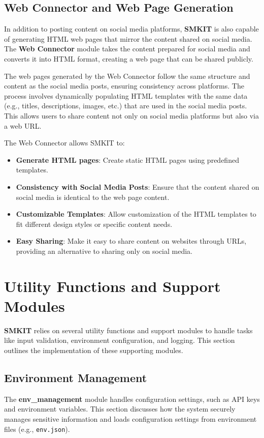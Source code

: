 \subsection{Web Connector and Web Page Generation}
\label{subsec:web_connector_and_web_page_generation}
In addition to posting content on social media platforms, \textbf{SMKIT} is also capable of generating HTML web pages that mirror the content shared on social media. The \textbf{Web Connector} module takes the content prepared for social media and converts it into HTML format, creating a web page that can be shared publicly.

The web pages generated by the Web Connector follow the same structure and content as the social media posts, ensuring consistency across platforms. The process involves dynamically populating HTML templates with the same data (e.g., titles, descriptions, images, etc.) that are used in the social media posts. This allows users to share content not only on social media platforms but also via a web URL.

The Web Connector allows SMKIT to:
\begin{itemize}
    \item \textbf{Generate HTML pages}: Create static HTML pages using predefined templates.
    \item \textbf{Consistency with Social Media Posts}: Ensure that the content shared on social media is identical to the web page content.
    \item \textbf{Customizable Templates}: Allow customization of the HTML templates to fit different design styles or specific content needs.
    \item \textbf{Easy Sharing}: Make it easy to share content on websites through URLs, providing an alternative to sharing only on social media.
\end{itemize}

\section{Utility Functions and Support Modules}
\label{sec:utility_functions_and_support_modules}
\textbf{SMKIT} relies on several utility functions and support modules to handle tasks like input validation, environment configuration, and logging. This section outlines the implementation of these supporting modules.

\subsection{Environment Management}
\label{subsec:Environment_management}
The \textbf{env\_management} module handles configuration settings, such as API keys and environment variables. This section discusses how the system securely manages sensitive information and loads configuration settings from environment files (e.g., \texttt{env.json}).

